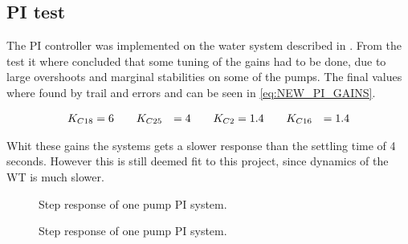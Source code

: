 \subsection*{PI test}

The PI controller was implemented on the water system described in . From the test it where concluded that some tuning of the gains had to be done, due to large overshoots and marginal stabilities on some of the pumps. The final values where found by trail and errors and can be seen in \eqref{eq:NEW_PI_GAINS}. 

\begin{equation}
\centering
	\begin{split}
	K_{C18} &= 6 \hspace{20pt} K_{C25} &= 4 \hspace{20pt} K_{C2} &= 1.4 \hspace{20pt} K_{C16} &= 1.4
	\end{split}
	\label{eq:NEW_PI_GAINS}
\end{equation}

Whit these gains the systems gets a slower response than the settling time of 4 seconds. However this is still deemed fit to this project, since dynamics of the WT is much slower.

\begin{figure}[H]
\centering

\caption{Step response of one pump PI system.}
\label{fig:Tikz_PI_PUMP_GAIN}
\end{figure}


\begin{figure}[H]
\centering

\caption{Step response of one pump PI system.}
\label{fig:Tikz_PI_PUMP_GAIN}
\end{figure}


